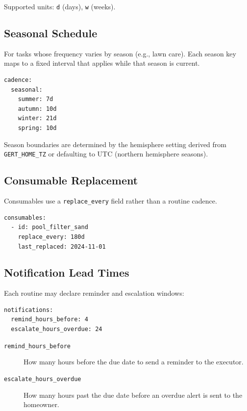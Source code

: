 Supported units: \texttt{d} (days), \texttt{w} (weeks).

\subsection{Seasonal Schedule}

For tasks whose frequency varies by season (e.g., lawn care). Each season key maps to a
fixed interval that applies while that season is current.

\begin{verbatim}
cadence:
  seasonal:
    summer: 7d
    autumn: 10d
    winter: 21d
    spring: 10d
\end{verbatim}

Season boundaries are determined by the hemisphere setting derived from
\texttt{GERT\_HOME\_TZ} or defaulting to UTC (northern hemisphere seasons).

\subsection{Consumable Replacement}

Consumables use a \texttt{replace\_every} field rather than a routine cadence.

\begin{verbatim}
consumables:
  - id: pool_filter_sand
    replace_every: 180d
    last_replaced: 2024-11-01
\end{verbatim}

\subsection{Notification Lead Times}

Each routine may declare reminder and escalation windows:

\begin{verbatim}
notifications:
  remind_hours_before: 4
  escalate_hours_overdue: 24
\end{verbatim}

\begin{description}
  \item[\texttt{remind\_hours\_before}] How many hours before the due date to send a reminder
        to the executor.
  \item[\texttt{escalate\_hours\_overdue}] How many hours past the due date before an overdue
        alert is sent to the homeowner.
\end{description}

